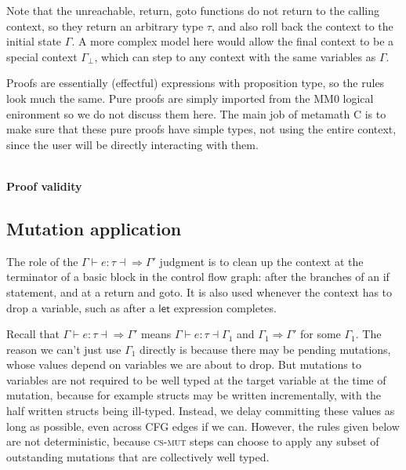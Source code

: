 \documentclass[acmsmall,nonacm]{acmart}
\DeclareMathOperator*{\Sep}{\scalerel*{\ast}{\sum}}
\newcommand{\wand}{\mathrel{-\!\!\ast}}
\newcommand{\proves}{\vdash}
\newcommand{\makes}{\dashv}
\newcommand{\constep}{\Rightarrow}
\newcommand{\makesto}{\dashv\!\constep}
\newcommand{\judgment}[2][]{\noindent\\\textbf{#1}\hspace{\stretch{1}}\fbox{$#2$}\nopagebreak}
\begin{document}
Note that the \textsf{unreachable}, \textsf{return}, \textsf{goto} functions do not return to the calling context, so they return an arbitrary type $\tau$, and also roll back the context to the initial state $\Gamma$. A more complex model here would allow the final context to be a special context $\Gamma_\bot$, which can step to any context with the same variables as $\Gamma$.

Proofs are essentially (effectful) expressions with proposition type, so the rules look much the same. Pure proofs are simply imported from the MM0 logical enironment so we do not discuss them here. The main job of metamath C is to make sure that these pure proofs have simple types, not using the entire context, since the user will be directly interacting with them.

\judgment[Proof validity]{\Gamma \proves p:A\makes\Gamma'}

\subsection{Mutation application}\label{sec:mutapp}

The role of the $\Gamma\proves e:\tau\makesto\Gamma'$ judgment is to clean up the context at the terminator of a basic block in the control flow graph: after the branches of an \textsf{if} statement, and at a \textsf{return} and \textsf{goto}. It is also used whenever the context has to drop a variable, such as after a $\mathsf{let}$ expression completes.

Recall that $\Gamma\proves e:\tau\makesto\Gamma'$ means $\Gamma\proves e:\tau\makes\Gamma_1$ and $\Gamma_1\constep\Gamma'$ for some $\Gamma_1$. The reason we can't just use $\Gamma_1$ directly is because there may be pending mutations, whose values depend on variables we are about to drop. But mutations to variables are not required to be well typed at the target variable at the time of mutation, because for example structs may be written incrementally, with the half written structs being ill-typed. Instead, we delay committing these values as long as possible, even across CFG edges if we can. However, the rules given below are not deterministic, because \textsc{cs-mut} steps can choose to apply any subset of outstanding mutations that are collectively well typed.
\end{document}
